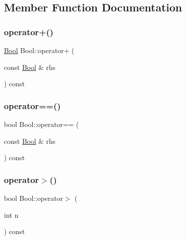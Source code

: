 \subsection{Member Function Documentation}
\mbox{\label{struct_bool_a6f4ecdec19082e896cffce66e6b6e7cc}} 
\subsubsection{\texorpdfstring{operator+()}{operator+()}}
{\footnotesize\ttfamily \hyperlink{struct_bool}{Bool} Bool\+::operator+ (\begin{DoxyParamCaption}\item[{const \hyperlink{struct_bool}{Bool} \&}]{rhs }\end{DoxyParamCaption}) const\hspace{0.3cm}{\ttfamily [inline]}}

\mbox{\label{struct_bool_afe799a4977c5ebe4c215d5d4ebd77adb}} 
\subsubsection{\texorpdfstring{operator==()}{operator==()}}
{\footnotesize\ttfamily bool Bool\+::operator== (\begin{DoxyParamCaption}\item[{const \hyperlink{struct_bool}{Bool} \&}]{rhs }\end{DoxyParamCaption}) const\hspace{0.3cm}{\ttfamily [inline]}}

\mbox{\label{struct_bool_a7baecbc58992eb06157fbbbaa560be0b}} 
\subsubsection{\texorpdfstring{operator$>$()}{operator>()}}
{\footnotesize\ttfamily bool Bool\+::operator$>$ (\begin{DoxyParamCaption}\item[{int}]{n }\end{DoxyParamCaption}) const\hspace{0.3cm}{\ttfamily [inline]}}



